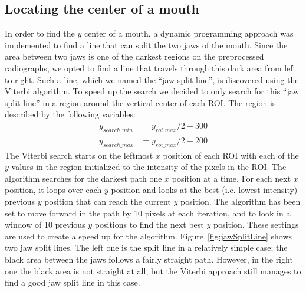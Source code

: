 \documentclass[a4paper]{article}
\begin{document}
\subsection{Locating the center of a mouth}
\label{subsect:center of mouth}
In order to find the $y$ center of a mouth, a dynamic programming approach was implemented to find a line that can split the two jaws of the mouth.
Since the area between two jaws is one of the darkest regions on the preprocessed radiographs, we opted to find a line that travels through this dark area from left to right.
Such a line, which we named the ``jaw split line'', is discovered using the Viterbi algorithm. 
To speed up the search we decided to only search for this ``jaw split line'' in a region around the vertical center of each ROI.
The region is described by the following variables:
\begin{align} 
y_{search\_min} &= y_{roi\_max} / 2 - 300\\ 
y_{search\_max} &= y_{roi\_max} / 2 + 200
\end{align}
The Viterbi search starts on the leftmost $x$ position of each ROI with each of the $y$ values in the region initialized to the intensity of the pixels in the ROI.
The algorithm searches for the darkest path one $x$ position at a time.
For each next $x$ position, it loops over each $y$ position and looks at the best (i.e. lowest intensity) previous $y$ position that can reach the current $y$ position.
The algorithm has been set to move forward in the path by 10 pixels at each iteration, and to look in a window of 10 previous $y$ positions to find the next best $y$ position.
These settings are used to create a speed up for the algorithm.
Figure~\ref{fig:jawSplitLine} shows two jaw split lines.
The left one is the split line in a relatively simple case; the black area between the jaws follows a fairly straight path. 
However, in the right one the black area is not straight at all, but the Viterbi approach still manages to find a good jaw split line in this case.
\end{document}
